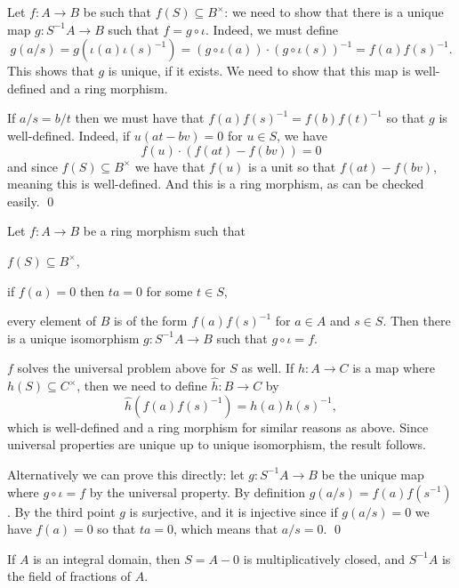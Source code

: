 \ethrm

\bproof

    Let $f\colon A\to B$ be such that $f(S)\subseteq B^\times$: we need to show that there is a unique map $g\colon S^{-1}A\to B$
    such that $f=g\circ\iota$.
    Indeed, we must define
    $$ g(a/s) = g(\iota(a)\iota(s)^{-1}) = (g\circ\iota(a))\cdot(g\circ\iota(s))^{-1} = f(a)f(s)^{-1} . $$
    This shows that $g$ is unique, if it exists.
    We need to show that this map is well-defined and a ring morphism.

    If $a/s=b/t$ then we must have that $f(a)f(s)^{-1}=f(b)f(t)^{-1}$ so that $g$ is well-defined.
    Indeed, if $u(at-bv)=0$ for $u\in S$, we have
    $$ f(u)\cdot(f(at)-f(bv)) = 0 $$
    and since $f(S)\subseteq B^\times$ we have that $f(u)$ is a unit so that $f(at)-f(bv)$, meaning this is well-defined.
    And this is a ring morphism, as can be checked easily.
    \qed

\eproof

\bcoro

    Let $f\colon A\to B$ be a ring morphism such that
    \benum
        \item $f(S)\subseteq B^\times$,
        \item if $f(a)=0$ then $ta=0$ for some $t\in S$,
        \item every element of $B$ is of the form $f(a)f(s)^{-1}$ for $a\in A$ and $s\in S$.
    \eenum
    Then there is a unique isomorphism $g\colon S^{-1}A\to B$ such that $g\circ\iota=f$.

\ecoro

\bproof

    $f$ solves the universal problem above for $S$ as well.
    If $h\colon A\to C$ is a map where $h(S)\subseteq C^\times$, then we need to define $\hat h\colon B\to C$ by
    $$ \hat h(f(a)f(s)^{-1}) = h(a)h(s)^{-1} , $$
    which is well-defined and a ring morphism for similar reasons as above.
    Since universal properties are unique up to unique isomorphism, the result follows.

    Alternatively we can prove this directly: let $g\colon S^{-1}A\to B$ be the unique map where $g\circ\iota=f$ by the universal property.
    By definition $g(a/s)=f(a)f(s^{-1})$.
    By the third point $g$ is surjective, and it is injective since if $g(a/s)=0$ we have $f(a)=0$ so that $ta=0$, which means that $a/s=0$.
    \qed

\eproof

\bexam

    If $A$ is an integral domain, then $S=A-0$ is multiplicatively closed, and $S^{-1}A$ is the field of fractions of $A$.


